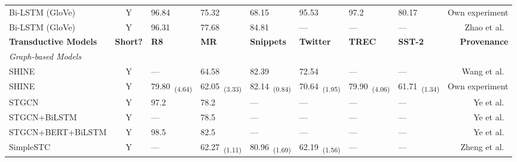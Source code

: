 \documentclass[runningheads]{llncs}
\begin{document}
\begin{table*}[!ht]
\begin{threeparttable}
{\begin{tabular}{lcllllllr}
            Bi-LSTM (GloVe)                         & Y                   & 96.84            & 75.32          & 68.15                             & 95.53            & 97.2          & 80.17          & Own experiment                  \\
            Bi-LSTM (GloVe)                         & Y                   & 96.31            & 77.68          & 84.81\tnote{$4$}                  & ---              & ---           & ---            & Zhao et al.~\cite{zhao2021sequential}      \\
            \toprule
            \textbf{Transductive Models}            & \textbf{Short?} & \textbf{R8}      & \textbf{MR}    & \textbf{Snippets}           & \textbf{Twitter} & \textbf{TREC} & \textbf{SST-2} & \textbf{Provenance}\\
            \midrule
            \textit{Graph-based Models} \\
            SHINE\tnote{$5$}                        & Y                   & ---              & 64.58          & 82.39                             & 72.54            & ---           & ---            & Wang et al.~\cite{shine}                   \\
            SHINE   & Y                   & 79.80~\textsubscript{(4.64)}            & 62.05~\textsubscript{(3.33)}         & 82.14~\textsubscript{(0.84)} & 70.64~\textsubscript{(1.95)}            & 79.90~\textsubscript{(4.06)}     & 61.71~\textsubscript{(1.34)}    & Own experiment                  \\
            STGCN                                   & Y                   & 97.2             & 78.2           & ---                               & ---              & ---           & ---            & Ye et al.~\cite{ye2020document}          \\
            STGCN+BiLSTM                            & Y                   & ---              & 78.5           & ---                               & ---              & ---           & ---            & Ye et al.~\cite{ye2020document}          \\
            STGCN+BERT+BiLSTM                       & Y                   & 98.5             & 82.5           & ---                               & ---              & ---           & ---            & Ye et al.~\cite{ye2020document}          \\
            SimpleSTC\tnote{$9$} & Y & --- & 62.27~\textsubscript{(1.11)} & 80.96~\textsubscript{(1.69)} & 62.19~\textsubscript{(1.56)} & --- & --- & Zheng et al.~\cite{DBLP:conf/emnlp/ZhengWYD22} \\

\end{tabular}}
\end{threeparttable}
\end{table*}
\end{document}
